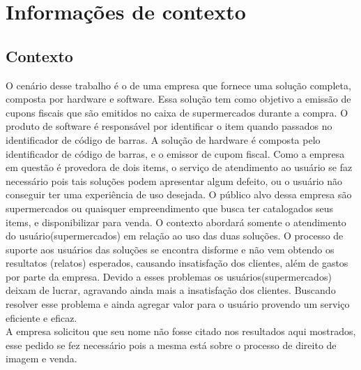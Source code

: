 \section{Informações de contexto}

\subsection{Contexto}
	O cenário desse trabalho é o de uma empresa que
	fornece uma solução completa, composta por hardware e software.
	Essa solução tem como objetivo a emissão de cupons fiscais que são emitidos no
	caixa de supermercados durante a compra.
	O produto de software é responsável por identificar o item quando passados no
	identificador de código de barras. A solução de hardware é composta pelo identificador
	de código de barras, e o emissor de cupom fiscal. Como a empresa em questão é
	provedora de dois items, o serviço de atendimento ao
	usuário se faz necessário pois tais soluções podem apresentar algum defeito, ou
	o usuário não conseguir ter uma experiência de uso desejada.
	O público alvo dessa empresa são supermercados ou quaisquer empreendimento
	que busca ter catalogados seus items, e disponibilizar para venda. O contexto
	abordará somente o atendimento do usuário(supermercados) em relação ao uso das duas soluções.
	O processo de suporte aos usuários das soluções se encontra disforme e não vem obtendo
	os resultatos (relatos) esperados, causando insatisfação dos clientes, além de gastos por parte da empresa.
	Devido a esses problemas os usuários(supermercados) deixam de lucrar, agravando ainda mais a insatisfação
	dos clientes. Buscando resolver esse problema e ainda agregar valor para o usuário provendo
	um serviço eficiente e eficaz.
	\\A empresa solicitou que seu nome não fosse citado nos resultados aqui mostrados, esse pedido
	se fez necessário pois a mesma está sobre o processo de direito de imagem e venda.
